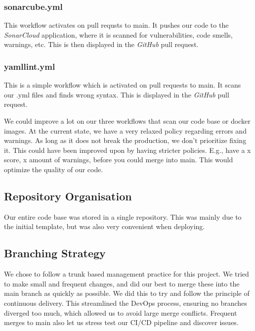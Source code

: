 \subsubsection{sonarcube.yml}
This workflow activates on pull requsts to main. It pushes our code to the \textit{SonarCloud} application, where it is scanned for vulnerabilities, code smells, warnings, etc. This is then displayed in the \textit{GitHub} pull request.

\subsubsection{yamllint.yml}
This is a simple workflow which is activated on pull requests to main. It scans our .yml files and finds wrong syntax. This is displayed in the \textit{GitHub} pull request.

We could improve a lot on our three workflows that scan our code base or docker images. At the current state, we have a very relaxed policy regarding errors and warnings. As long as it does not break the production, we don't prioritize fixing it. This could have been improved upon by having stricter policies. E.g., have a x score, x amount of warnings, before you could merge into main. This would optimize the quality of our code. 




\subsection{Repository Organisation}
Our entire code base was stored in a single repository. This was mainly due to the initial template, but was also very convenient when deploying.


\subsection{Branching Strategy}

We chose to follow a trunk based management practice for this project. We tried to make small and frequent changes, and did our best to merge these into the main branch as quickly as possible. We did this to try and follow the principle of continuous delivery. This streamlined the DevOps process, ensuring no branches diverged too much, which allowed us to avoid large merge conflicts. Frequent merges to main also let us stress test our CI/CD pipeline and discover issues.

